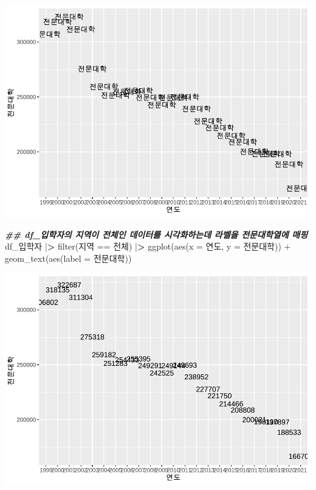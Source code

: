 \documentclass[
]{article}
\newenvironment{Shaded}{\begin{snugshade}}{\end{snugshade}}
\newcommand{\AttributeTok}[1]{\textcolor[rgb]{0.77,0.63,0.00}{#1}}
\newcommand{\DocumentationTok}[1]{\textcolor[rgb]{0.56,0.35,0.01}{\textbf{\textit{#1}}}}
\newcommand{\ErrorTok}[1]{\textcolor[rgb]{0.64,0.00,0.00}{\textbf{#1}}}
\newcommand{\FunctionTok}[1]{\textcolor[rgb]{0.00,0.00,0.00}{#1}}
\newcommand{\NormalTok}[1]{#1}
\newcommand{\SpecialCharTok}[1]{\textcolor[rgb]{0.00,0.00,0.00}{#1}}
\newcommand{\StringTok}[1]{\textcolor[rgb]{0.31,0.60,0.02}{#1}}
\begin{document}
\includegraphics{chap3_files/figure-latex/unnamed-chunk-16-1.pdf}

\begin{Shaded}
\begin{Highlighting}[]
\DocumentationTok{\#\# df\_입학자의 지역이 \textquotesingle{}전체\textquotesingle{}인 데이터를 시각화하는데 라벨을 \textquotesingle{}전문대학\textquotesingle{}열에 매핑}
\NormalTok{df\_입학자 }\SpecialCharTok{|}\ErrorTok{\textgreater{}} \FunctionTok{filter}\NormalTok{(지역 }\SpecialCharTok{==} \StringTok{\textquotesingle{}전체\textquotesingle{}}\NormalTok{) }\SpecialCharTok{|}\ErrorTok{\textgreater{}}
  \FunctionTok{ggplot}\NormalTok{(}\FunctionTok{aes}\NormalTok{(}\AttributeTok{x =}\NormalTok{ 연도, }\AttributeTok{y =}\NormalTok{ 전문대학)) }\SpecialCharTok{+}
  \FunctionTok{geom\_text}\NormalTok{(}\FunctionTok{aes}\NormalTok{(}\AttributeTok{label =}\NormalTok{ 전문대학))}
\end{Highlighting}
\end{Shaded}

\includegraphics{chap3_files/figure-latex/unnamed-chunk-16-2.pdf}
\end{document}
